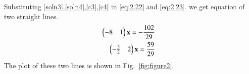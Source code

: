 \documentclass[journal,12pt,twocolumn]{IEEEtran}
\begin{document}
Substituting \eqref{soln3},\eqref{soln4},\eqref{c3},\eqref{c4} in \eqref{eq:2.22} and \eqref{eq:2.23}. we get equation of two straight lines.
\begin{align}
    \begin{pmatrix}-8 & 1\end{pmatrix}\mathbf{x}=-\frac{102}{29}\\
    \begin{pmatrix}-\frac{3}{2} & 2\end{pmatrix}\mathbf{x}=\frac{59}{29}
\end{align}
The plot of these two lines is shown in Fig.~\ref{fig:figure2}.
\end{document}
